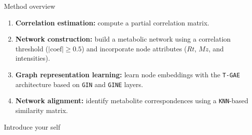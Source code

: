\documentclass[aspectratio=169]{beamer}
\renewcommand{\alert}[1]{\textbf{\color{swufe}#1}}
\begin{document}
    \begin{frame}{Method overview}

        \begin{enumerate}
            \item \alert{Correlation estimation:} compute a partial correlation matrix.
            \item \alert{Network construction:} build a metabolic network using a correlation threshold ($|\text{coef}| \geq 0.5$) and incorporate node attributes ($Rt$, $Mz$, and intensities).
            \item \alert{Graph representation learning:} learn node embeddings with the \texttt{T-GAE} architecture based on \texttt{GIN} and \texttt{GINE} layers.
            \item \alert{Network alignment:} identify metabolite correspondences using a \texttt{KNN}-based similarity matrix.
        \end{enumerate}

        \begin{note}
            {Introduce your self}
        \end{note}
    \end{frame}
\end{document}
